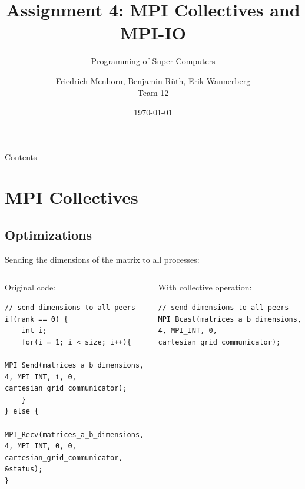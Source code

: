\documentclass[9pt,pdftex,xcolor=dvipsnames]{beamer}
\title{Assignment 4: MPI Collectives and MPI-IO}
\subtitle{Programming of Super Computers}
\author[Friedrich Menhorn, Benjamin Rüth, Erik Wannerberg] {Friedrich Menhorn, Benjamin Rüth, Erik Wannerberg \\ Team 12} %
\date{\today}
\institute{Technische Universität München}
\begin{document}
\frame{\maketitle}

\begin{frame}{Contents}
\tableofcontents
\end{frame}


\section{MPI Collectives}
\begin{frame}{\phantom{Contents}}
\tableofcontents[
  currentsection  
]
\end{frame}


\subsection{Optimizations}
\begin{frame}[fragile]{\insertsubsection}
Sending the dimensions of the matrix to all processes:
\begin{columns}
\begin{block}{Original code:}
\begin{lstlisting}
// send dimensions to all peers
if(rank == 0) {
    int i;
    for(i = 1; i < size; i++){
        MPI_Send(matrices_a_b_dimensions, 4, MPI_INT, i, 0, cartesian_grid_communicator);
    }
} else {
    MPI_Recv(matrices_a_b_dimensions, 4, MPI_INT, 0, 0, cartesian_grid_communicator, &status);
}
\end{lstlisting}
\end{block}

\begin{block}{With collective operation:}
\begin{lstlisting}	
// send dimensions to all peers
MPI_Bcast(matrices_a_b_dimensions, 4, MPI_INT, 0, cartesian_grid_communicator);
\end{lstlisting}
\end{block}
\end{columns}
\end{frame}
\end{document}
